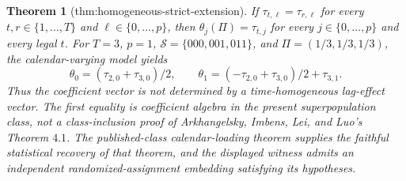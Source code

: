 \documentclass{article}
\newtheorem{theorem}{Theorem}
\begin{document}
\begin{theorem}[thm:homogeneous-strict-extension]\label{thm:homogeneous-strict-extension}
If \(\tau_{t,\ell}=\tau_{r,\ell}\) for every \(t,r\in\{1,\ldots,T\}\) and \(\ell\in\{0,\ldots,p\}\), then \(\theta_j(\Pi)=\tau_{t,j}\) for every \(j\in\{0,\ldots,p\}\) and every legal \(t\).  For \(T=3\), \(p=1\), \(\mathcal S=\{000,001,011\}\), and \(\Pi=(1/3,1/3,1/3)\), the calendar-varying model yields
\[
 \theta_0=(\tau_{2,0}+\tau_{3,0})/2,
 \qquad
 \theta_1=(-\tau_{2,0}+\tau_{3,0})/2+\tau_{3,1}.
\]
Thus the coefficient vector is not determined by a time-homogeneous lag-effect vector.  The first equality is coefficient algebra in the present superpopulation class, not a class-inclusion proof of Arkhangelsky, Imbens, Lei, and Luo's Theorem \(4.1\).  The published-class calendar-loading theorem supplies the faithful statistical recovery of that theorem, and the displayed witness admits an independent randomized-assignment embedding satisfying its hypotheses.
\end{theorem}
\end{document}
